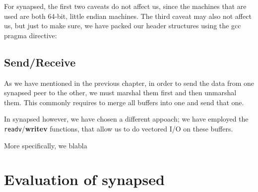 For synapsed, the first two caveats do not affect us, since the machines that 
are used are both 64-bit, little endian machines. The third caveat may also not 
affect us, but just to make sure, we have packed our header structures using 
the gcc pragma directive:


\subsection{Send/Receive}

As we have mentioned in the previous chapter, in order to send the data from 
one synapsed peer to the other, we must marshal them first and then unmarshal 
them. This commonly requires to merge all buffers into one and send that one.  

In synapsed however, we have chosen a different appoach; we have employed the 
\texttt{readv}/\textbf{writev} functions, that allow us to do vectored I/O on 
these buffers.

More specifically, we blabla

\section{Evaluation of synapsed}
